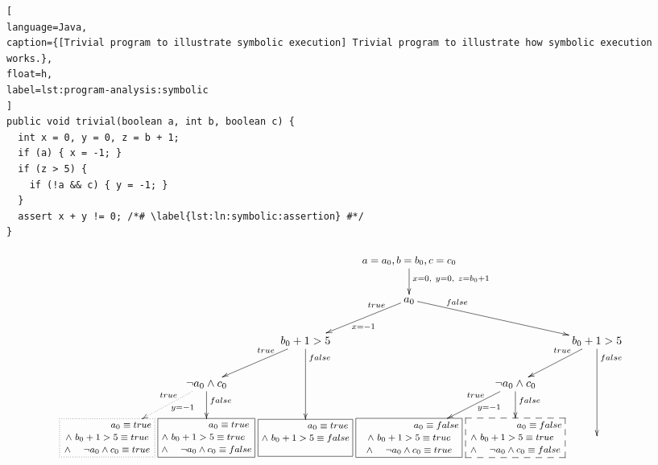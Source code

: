 \begin{lstlisting}[
language=Java,
caption={[Trivial program to illustrate symbolic execution] Trivial program to illustrate how symbolic execution works.},
float=h,
label=lst:program-analysis:symbolic
]
public void trivial(boolean a, int b, boolean c) {
  int x = 0, y = 0, z = b + 1;
  if (a) { x = -1; }
  if (z > 5) {
    if (!a && c) { y = -1; }
  }
  assert x + y != 0; /*# \label{lst:ln:symbolic:assertion} #*/
}
\end{lstlisting}

\begin{figure}[t]
\[\xymatrix@C=0.3em{
	 & & & \ar[d]^{x = 0,~y = 0,~z = b_{0} + 1} \txt{\small $a = a_{0},b = b_{0}, c = c_{0}$} \\
	 & & & \ar@{}[ld]_<(0.2){true} \ar[ld]^{x=-1} a_{0} \ar[rrd] \ar@{}[rrd]^<(0.2){false} \\
	 & & \ar@{}[ld]_<(0.2){true} \ar[ld] b_{0} + 1 > 5 \ar[dd] \ar@{}[dd]^<(0.1){false} & & & \ar@{}[ld]_<(0.2){true} \ar[ld] b_{0} + 1 > 5 \ar[dd] \ar@{}[dd]^<(0.1){false} \\ 
	 & \ar@{}[ld]_<(0.2){true} \ar@{.>}[ld]^>(0.5){y=-1} \neg a_{0} \land c_{0} \ar[d] \ar@{}[d]^<(0.2){false} & & & \ar@{}[ld]_<(0.2){true} \ar[ld]^>(0.5){y=-1} \neg a_{0} \land c_{0} \ar[d] \ar@{}[d]^<(0.2){false} & & & \\
	 *+[F.] \txt{\footnotesize $~~~~~~~~~~~~~~~a_{0} \equiv true$ 
	 \\ \footnotesize $\land ~b_{0}+1 > 5 \equiv true$ 
	 \\ \footnotesize $\land ~~~~\neg a_{0} \land c_{0} \equiv true$} & 
	 *+[F] \txt{\footnotesize $~~~~~~~~~~~~~~a_{0} \equiv true$ 
	 \\ \footnotesize $\land ~b_{0}+1 > 5 \equiv true~~$ 
	 \\ \footnotesize $\land ~~~~\neg a_{0} \land c_{0} \equiv false$} & 
	 *+[F] \txt{\footnotesize $~~~~~~~~~~~~~~a_{0} \equiv true$ 
	 \\ \footnotesize $\land ~b_{0}+1 > 5 \equiv false$
	 \\ ~} & 
	 *+[F] \txt{\footnotesize $~~~~~~~~~~~~~~~~~a_{0} \equiv false$ 
	 \\ \footnotesize $\land ~b_{0}+1 > 5 \equiv true$ 
	 \\ \footnotesize $~\land ~~~~\neg a_{0} \land c_{0} \equiv true ~$} &
	 *+[F--] \txt{\footnotesize $~~~~~~~~~~~~~~~a_{0} \equiv false$ 
	 \\ \footnotesize $\land ~b_{0}+1 > 5 \equiv true~~$ 
	 \\ \footnotesize $\land ~~~~\neg a_{0} \land c_{0} \equiv false$} &
}\]
\end{figure}
